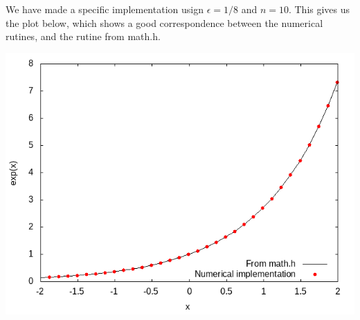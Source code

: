 \documentclass{article}
\begin{document}
We have made a specific implementation usign $\epsilon = 1/8$ and $n = 10$. This gives us the plot below, which shows a good correspondence between the numerical rutines, and the rutine from math.h. 
%
\begin{center}
	\includegraphics[width = \columnwidth]{plot.png}
\end{center}
\end{document}
